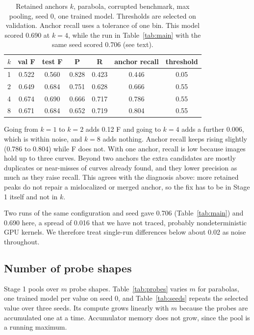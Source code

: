 \documentclass[11pt]{article}
\begin{document}
\begin{table}[t]
\centering
\caption{Retained anchors $k$, parabola, corrupted benchmark, max pooling, seed 0, one trained model. Thresholds are selected on validation. Anchor recall uses a tolerance of one bin. This model scored 0.690 at $k=4$, while the run in Table~\ref{tab:main} with the same seed scored 0.706 (see text).}
\label{tab:ablate}
\small
\begin{tabular}{lcccccc}
\toprule
$k$ & \textbf{val F} & \textbf{test F} & \textbf{P} & \textbf{R} & \textbf{anchor recall} & \textbf{threshold} \\
\midrule
1 & 0.522 & 0.560 & 0.828 & 0.423 & 0.446 & 0.05 \\
2 & 0.649 & 0.684 & 0.751 & 0.628 & 0.666 & 0.55 \\
4 & 0.674 & 0.690 & 0.666 & 0.717 & 0.786 & 0.55 \\
8 & 0.671 & 0.684 & 0.652 & 0.719 & 0.804 & 0.55 \\
\bottomrule
\end{tabular}
\end{table}

Going from $k=1$ to $k=2$ adds 0.12 F and going to $k=4$ adds a further 0.006, which is within noise, and $k=8$ adds nothing. Anchor recall keeps rising slightly (0.786 to 0.804) while F does not. With one anchor, recall is low because images hold up to three curves. Beyond two anchors the extra candidates are mostly duplicates or near-misses of curves already found, and they lower precision as much as they raise recall. This agrees with the diagnosis above: more retained peaks do not repair a mislocalized or merged anchor, so the fix has to be in Stage 1 itself and not in $k$.

Two runs of the same configuration and seed gave 0.706 (Table~\ref{tab:main}) and 0.690 here, a spread of 0.016 that we have not traced, probably nondeterministic GPU kernels. We therefore treat single-run differences below about 0.02 as noise throughout.

\subsection{Number of probe shapes}
\label{sec:probes}
Stage 1 pools over $m$ probe shapes. Table~\ref{tab:probes} varies $m$ for parabolas, one trained model per value on seed 0, and Table~\ref{tab:seeds} repeats the selected value over three seeds. Its compute grows linearly with $m$ because the probes are accumulated one at a time. Accumulator memory does not grow, since the pool is a running maximum.
\end{document}
